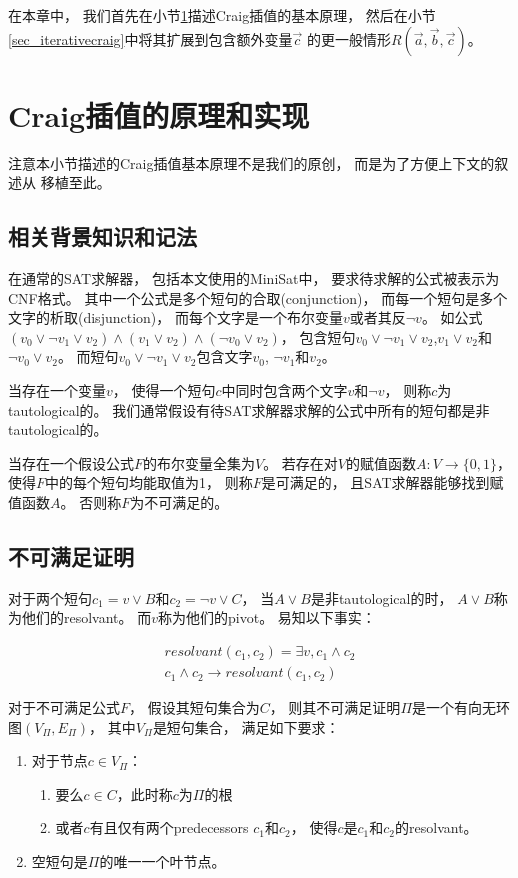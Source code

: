在本章中，
我们首先在小节\ref{sec_craigimp}描述Craig插值的基本原理，
然后在小节\ref{sec_iterativecraig}中将其扩展到包含额外变量$\vec{c}$ 的更一般情形$R(\vec{a},\vec{b},\vec{c})$。

\section{Craig插值的原理和实现}\label{sec_craigimp}
注意本小节描述的Craig插值基本原理不是我们的原创，
而是为了方便上下文的叙述从 移植至此。
\subsection{相关背景知识和记法}
在通常的SAT求解器，
包括本文使用的MiniSat中，
要求待求解的公式被表示为CNF格式。
其中一个公式是多个短句的合取(conjunction)，
而每一个短句是多个文字的析取(disjunction)，
而每个文字是一个布尔变量$v$或者其反$\neg v$。
如公式$(v_0\vee\neg v_1\vee v_2)\wedge(v_1\vee v_2)\wedge(\neg v_0\vee v_2)$，
包含短句$v_0\vee\neg v_1\vee v_2$,$v_1\vee v_2$和$\neg v_0\vee v_2$。
而短句$v_0\vee\neg v_1\vee v_2$包含文字$v_0$, $\neg v_1$和$v_2$。

当存在一个变量$v$，
使得一个短句$c$中同时包含两个文字$v$和$\neg v$，
则称$c$为tautological的。
我们通常假设有待SAT求解器求解的公式中所有的短句都是非tautological的。

当存在一个假设公式$F$的布尔变量全集为$V$。
若存在对$V$的赋值函数$A:V\to \{0,1\}$，
使得$F$中的每个短句均能取值为1，
则称$F$是可满足的，
且SAT求解器能够找到赋值函数$A$。
否则称$F$为不可满足的。

\subsection{不可满足证明}
对于两个短句$c_1=v\vee B$和$c_2=\neg v\vee C$，
当$A\vee B$是非tautological的时，
$A\vee B$称为他们的resolvant。
而$v$称为他们的pivot。
易知以下事实：

\begin{equation}
\begin{array}{ccc}
&resolvant(c_1,c_2) = \exists v, c_1\wedge c_2 &\\
&c_1\wedge c_2 \to resolvant(c_1,c_2)&
\end{array}
\end{equation}

\begin{definition}
对于不可满足公式$F$，
假设其短句集合为$C$，
则其不可满足证明$\Pi$是一个有向无环图$(V_{\Pi},E_{\Pi})$，
其中$V_{\Pi}$是短句集合，
满足如下要求：
\begin{enumerate}
\item 对于节点$c\in V_{\Pi}$：
  \begin{enumerate}
    \item 要么$c\in C$，此时称$c$为$\Pi$的根
    \item 或者$c$有且仅有两个predecessors $c_1$和$c_2$，
    使得$c$是$c_1$和$c_2$的resolvant。
  \end{enumerate}
\item 空短句是$\Pi$的唯一一个叶节点。
\end{enumerate}
\end{definition}

